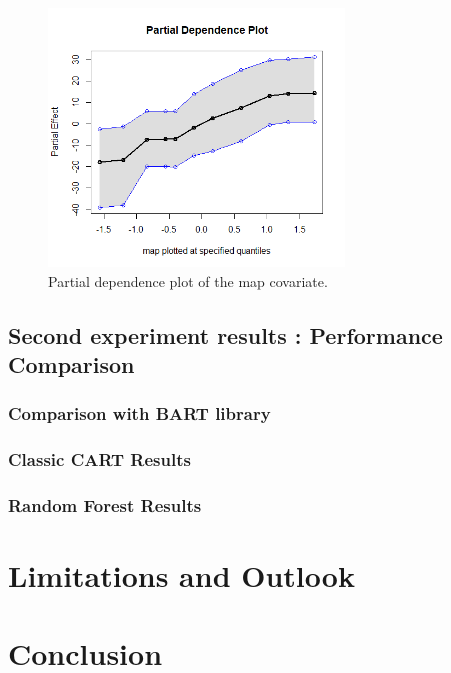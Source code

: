 \documentclass{usiinftr}
\begin{document}
\begin{figure}[h!] 
\centering
\includegraphics[width=0.7\textwidth]{images/PD_map.png}
\caption{Partial dependence plot of the map covariate.}
\label{PDmap}
\end{figure}

\subsection{Second experiment results : Performance Comparison}

\subsubsection{Comparison with BART library}
\subsubsection{Classic CART Results}
\subsubsection{Random Forest Results}

\section{Limitations and Outlook}


\section{Conclusion}





\end{document}
